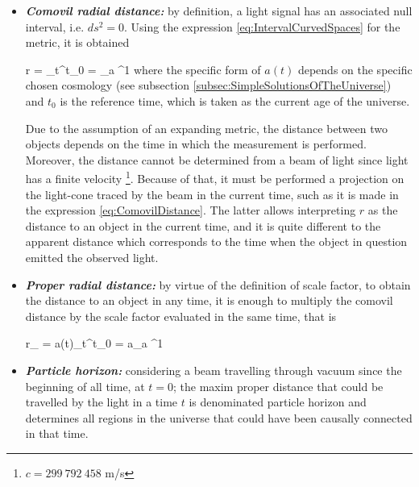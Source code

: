 \begin{itemize}
\item \textit{\textbf{Comovil radial distance:}} by definition, a light
signal has an associated null interval, i.e. $ds^2 = 0$. Using the 
expression \ref{eq:IntervalCurvedSpaces} for the metric, it is obtained


{ r = \int_t^{t_0}  = \int_a ^1  }
where the specific form of $a(t)$ depends on the specific chosen cosmology
(see subsection \ref{subsec:SimpleSolutionsOfTheUniverse}) and $t_0$ is the
reference time, which is taken as the current age of the universe.


Due to the assumption of an expanding metric, the distance between two 
objects depends on the time in which the measurement is performed. 
Moreover, the distance cannot be determined from a beam of light since
light has a finite velocity \footnote{$c=299\ 792\ 458$ m/s}. Because of 
that, it must be performed a projection on the light-cone traced by the 
beam in the current time, such as it is made in the expression 
\ref{eq:ComovilDistance}. The latter allows interpreting $r$ as the 
distance to an object in the current time, and it is quite different to
the apparent distance which corresponds to the time when the object in 
question emitted the observed light.


\item \textit{\textbf{Proper radial distance:}} by virtue of the 
definition of scale factor, to obtain the distance to an object in any 
time, it is enough to multiply the comovil distance by the scale factor 
evaluated in the same time, that is



{ r_{} = a(t)\int_t^{t_0}  = 
a\int_a ^1  }


\item \textit{\textbf{Particle horizon:}} considering a beam travelling 
through vacuum since the beginning of all time, at $t=0$; the maxim proper
distance that could be travelled by the light in a time $t$ is denominated 
particle horizon and determines all regions in the universe that could 
have been causally connected in that time. 




\end{itemize}
